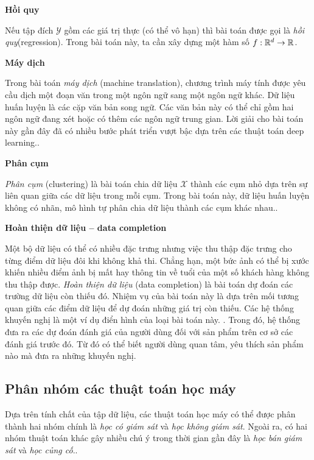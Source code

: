 \textbf{Hồi quy}

Nếu tập đích $\mathcal{Y}$ gồm các giá trị thực (có thể vô hạn) thì bài toán được gọi là \textit{hồi quy}(regression). Trong bài toán này, ta cần xây dựng một hàm số $f: \mathbb{R}^d \rightarrow \mathbb{R}$.



\textbf{Máy dịch}


Trong bài toán \textit{máy dịch} (machine translation), chương trình máy tính được yêu cầu dịch một đoạn văn trong
một ngôn ngữ sang một ngôn ngữ khác. Dữ liệu huấn luyện là các cặp văn bản song
ngữ. Các văn bản này có thể chỉ gồm hai ngôn ngữ đang xét hoặc có thêm các ngôn
ngữ trung gian. Lời giải cho bài toán này gần đây đã có nhiều bước phát triển
vượt bậc dựa trên các thuật toán deep learning.\cite{V2}.


\textbf{Phân cụm}

\textit{Phân cụm} (clustering) là bài toán chia dữ liệu $\mathcal{X}$ thành các cụm nhỏ dựa trên sự liên
quan giữa các dữ liệu trong mỗi cụm. Trong bài toán này, dữ liệu huấn luyện không có nhãn, mô hình tự phân chia dữ liệu thành các cụm khác nhau.\cite{V1}.

\textbf{Hoàn thiện dữ liệu -- data completion}


Một bộ dữ liệu có thể có nhiều đặc trưng nhưng việc thu thập đặc trưng cho từng
điểm dữ liệu đôi khi không khả thi. Chẳng hạn, một bức ảnh có thể bị xước khiến
nhiều điểm ảnh bị mất hay thông tin về tuổi của một số khách hàng không thu thập
được. \textit{Hoàn thiện dữ liệu} (data completion) là bài toán dự đoán các trường dữ liệu còn
thiếu đó. Nhiệm vụ của bài toán này là dựa trên mối tương quan giữa các điểm dữ
liệu để dự đoán những giá trị còn thiếu. Các hệ thống khuyến nghị là một ví dụ điển hình của loại bài toán này. \cite{V1}. Trong đó, hệ thống đưa ra các dự đoán đánh giá của người dùng đối với sản phẩm trên cơ sở các đánh giá trước đó. Từ đó có thể biết người dùng quan tâm, yêu thích sản phẩm nào mà đưa ra những khuyến nghị.


\subsection{Phân nhóm các thuật toán học máy}
Dựa trên tính chất của tập dữ liệu, các thuật toán học máy có thể
được phân thành hai nhóm chính là \textit{học có giám sát} và \textit{học không giám sát}. Ngoài ra, có hai nhóm thuật toán khác gây nhiều chú ý trong thời gian gần đây là \textit{học bán giám sát} và \textit{học củng cố}.\cite{V1}.


